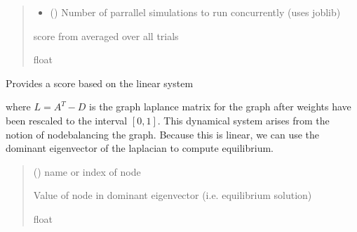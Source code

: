 \documentclass[letterpaper,10pt,english]{sphinxmanual}
\begin{document}
\begin{fulllineitems}
\begin{fulllineitems}
\begin{quote}
\begin{description}
\begin{itemize}
\item {} 
\sphinxAtStartPar
{} () \textendash{} Number of parrallel simulations to run concurrently (uses joblib)

\end{itemize}

\sphinxAtStartPar
score from {\hyperref[\detokenize{friendlynets:friendlyNet.friendlyNet.lotka_volterra_score_single}]{}} averaged over all trials

\sphinxAtStartPar
float

\end{description}\end{quote}

\end{fulllineitems}


\begin{fulllineitems}
\label{\detokenize{friendlynets:friendlyNet.friendlyNet.node_balanced_score}}
\pysigstartsignatures
{}
\pysigstopsignatures
\sphinxAtStartPar
Provides a score based on the linear system

\sphinxAtStartPar
where \(L= A^T-D\) is the graph laplance matrix for the graph after weights have been rescaled to the interval \([0,1]\).
This dynamical system arises from the notion of node\sphinxhyphen{}balancing the graph. Because this is linear, we can use the dominant eigenvector of the
laplacian to compute equilibrium.
\begin{quote}\begin{description}
\sphinxAtStartPar
{} () \textendash{} name or index of node

\sphinxAtStartPar
Value of node in dominant eigenvector (i.e. equilibrium solution)

\sphinxAtStartPar
float


\end{description}
\end{quote}
\end{fulllineitems}
\end{fulllineitems}
\end{document}
